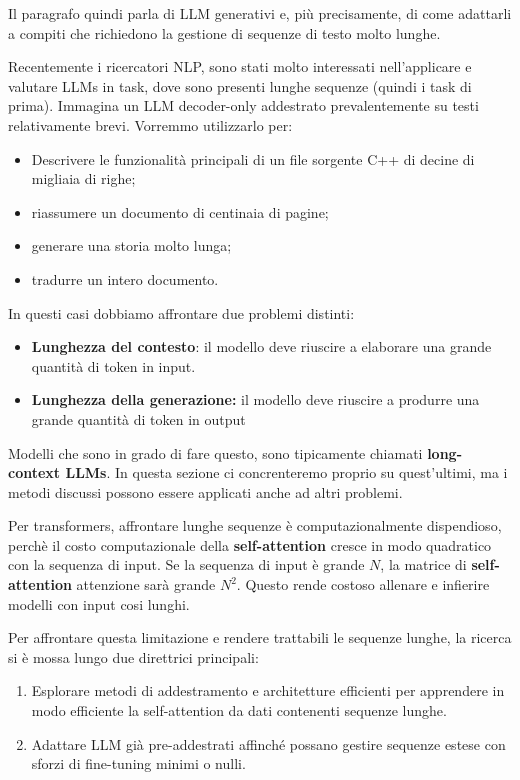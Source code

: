Il paragrafo quindi parla di LLM generativi e, più precisamente, di come adattarli a compiti che richiedono la gestione di sequenze di testo molto lunghe.

Recentemente i ricercatori NLP, sono stati molto interessati nell'applicare e valutare LLMs in task, dove sono presenti lunghe sequenze (quindi i task di prima).
Immagina un LLM decoder-only addestrato prevalentemente su testi relativamente brevi. Vorremmo utilizzarlo per:
\begin{itemize}
    \item Descrivere le funzionalità principali di un file sorgente C++ di decine di migliaia di righe;
    \item riassumere un documento di centinaia di pagine;
    \item generare una storia molto lunga;
    \item tradurre un intero documento.
\end{itemize}
In questi casi dobbiamo affrontare due problemi distinti:
\begin{itemize}
    \item \textbf{Lunghezza del contesto}: il modello deve riuscire a elaborare una grande quantità di token in input.
    \item \textbf{Lunghezza della generazione:} il modello deve riuscire a produrre una grande quantità di token in output
\end{itemize}
Modelli che sono in grado di fare questo, sono tipicamente chiamati \textbf{long-context LLMs}. In questa sezione ci concrenteremo proprio su quest'ultimi, ma i metodi discussi possono essere applicati anche ad altri problemi.

Per transformers, affrontare lunghe sequenze è computazionalmente dispendioso, perchè il costo computazionale della \textbf{self-attention} cresce in modo quadratico con la sequenza di input.
Se la sequenza di input è grande $N$, la matrice di \textbf{self-attention} attenzione sarà grande $N^2$.
Questo rende costoso allenare e infierire modelli con input cosi lunghi.

Per affrontare questa limitazione e rendere trattabili le sequenze lunghe, la ricerca si è mossa lungo due direttrici principali:
\begin{enumerate}
\item Esplorare metodi di addestramento e architetture efficienti per apprendere in modo efficiente la self-attention da dati contenenti sequenze lunghe.
\item Adattare LLM già pre-addestrati affinché possano gestire sequenze estese con sforzi di fine-tuning minimi o nulli.
\end{enumerate}


